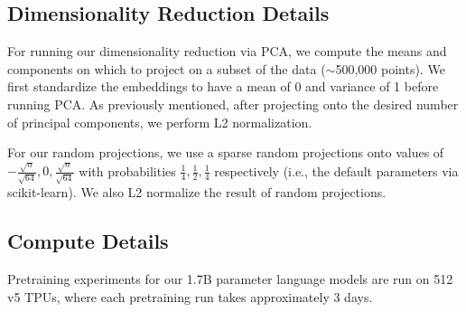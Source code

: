\subsection{Dimensionality Reduction Details}

For running our dimensionality reduction via PCA, we compute the means and components on which to project on a subset of the data ($\sim$500,000 points). 
We first standardize the embeddings to have a mean of 0 and variance of 1 before running PCA. As previously mentioned, after projecting onto the desired number of principal components, we perform L2 normalization.

For our random projections, we use a sparse random projections onto values of $-\frac{\sqrt{n}}{\sqrt{64}}, 0, \frac{\sqrt{n}}{\sqrt{64}}$ with probabilities $\frac{1}{4}, \frac{1}{2}, \frac{1}{4}$ respectively (i.e., the default parameters via scikit-learn). We also L2 normalize the result of random projections.

\subsection{Compute Details}

Pretraining experiments for our 1.7B parameter language models are run on 512 v5 TPUs, where each pretraining run takes approximately 3 days. 

